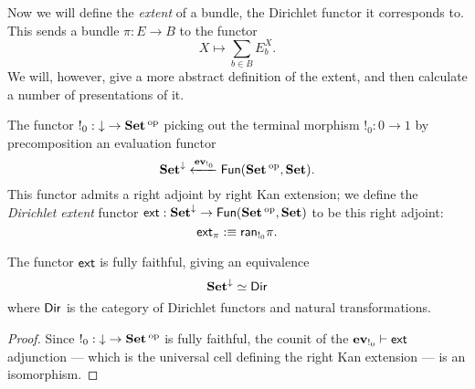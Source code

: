 Now we will define the \emph{extent} of a bundle, the Dirichlet functor it
corresponds to. This sends a bundle
$\pi : E \to B$ to the functor
$$X \mapsto \sum_{b \in B} E_b^X.$$
We will, however, give a more abstract definition of the extent, and then
calculate a number of presentations of it.

\begin{defn}
  The functor $!_0 : \down \to \Set\op$ picking out the terminal morphism
  $!_0 : 0 \to 1$ by precomposition an evaluation functor
  $$\Set^{\down} \xleftarrow{\ev_{!_0}} \Fun(\Set\op, \Set).$$
  This functor admits a right adjoint by right Kan extension; we define the
  \emph{Dirichlet extent} functor $\ext : \Set^{\down} \to \Fun(\Set\op,
  \Set)$ to be this right adjoint:
  $$\ext_{\pi} :\equiv \term{ran}_{!_0} \pi.$$
\end{defn}

\begin{prop}
  The functor $\ext$ is fully faithful, giving an equivalence
  $$\Set^{\down} \simeq \Dir$$
  where $\Dir$ is the category of Dirichlet functors and natural transformations.
\end{prop}
\begin{proof}
Since $!_0 : \down \to \Set\op$ is fully faithful, the counit of the
$\ev_{!_0} \vdash \ext$ adjunction --- which is the universal cell defining the
right Kan extension --- is an isomorphism. 
\end{proof}

